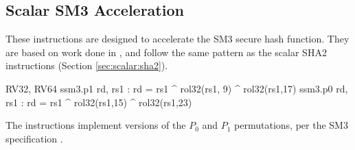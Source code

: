 
\subsection{Scalar SM3 Acceleration}
\label{sec:scalar:sm3}

These instructions are designed to accelerate the SM3 secure
hash function\cite{ietf:sm3}.
They are based on work done in \cite{MJS:LWSHA:20}, and follow
the same pattern as the scalar SHA2 instructions
(Section \ref{sec:scalar:sha2}).

\begin{cryptoisa}
RV32, RV64
    ssm3.p1 rd, rs1 : rd = rs1 ^ rol32(rs1, 9) ^ rol32(rs1,17)
    ssm3.p0 rd, rs1 : rd = rs1 ^ rol32(rs1,15) ^ rol32(rs1,23)
\end{cryptoisa}

The instructions implement versions of the $P_0$ and $P_1$
permutations, per the SM3 specification \cite{ietf:sm3}.

